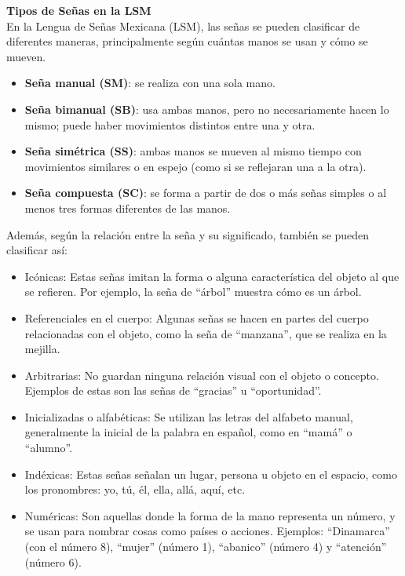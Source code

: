 \textbf{Tipos de Señas en la LSM}\\
En la Lengua de Señas Mexicana (LSM), las señas se pueden clasificar de diferentes maneras, principalmente según cuántas manos se usan y cómo se mueven.

\begin{itemize}
    \item \textbf{Seña manual (SM)}: se realiza con una sola mano.
    \item \textbf{Seña bimanual (SB)}: usa ambas manos, pero no necesariamente hacen lo mismo; puede haber movimientos distintos entre una y otra.
    \item \textbf{Seña simétrica (SS)}: ambas manos se mueven al mismo tiempo con movimientos similares o en espejo (como si se reflejaran una a la otra).
    \item \textbf{Seña compuesta (SC)}: se forma a partir de dos o más señas simples o al menos tres formas diferentes de las manos.
\end{itemize}

\newpage
Además, según la relación entre la seña y su significado, también se pueden clasificar así:
\begin{itemize}
    \item Icónicas: Estas señas imitan la forma o alguna característica del objeto al que se refieren. Por ejemplo, la seña de “árbol” muestra cómo es un árbol.
    \item Referenciales en el cuerpo: Algunas señas se hacen en partes del cuerpo relacionadas con el objeto, como la seña de “manzana”, que se realiza en la mejilla.
    \item Arbitrarias: No guardan ninguna relación visual con el objeto o concepto. Ejemplos de estas son las señas de “gracias” u “oportunidad”.
    \item Inicializadas o alfabéticas: Se utilizan las letras del alfabeto manual, generalmente la inicial de la palabra en español, como en “mamá” o “alumno”.
    \item Indéxicas: Estas señas señalan un lugar, persona u objeto en el espacio, como los pronombres: yo, tú, él, ella, allá, aquí, etc.
    \item Numéricas: Son aquellas donde la forma de la mano representa un número, y se usan para nombrar cosas como países o acciones. Ejemplos: “Dinamarca” (con el número 8), “mujer” (número 1), “abanico” (número 4) y “atención” (número 6).\\
\end{itemize}

